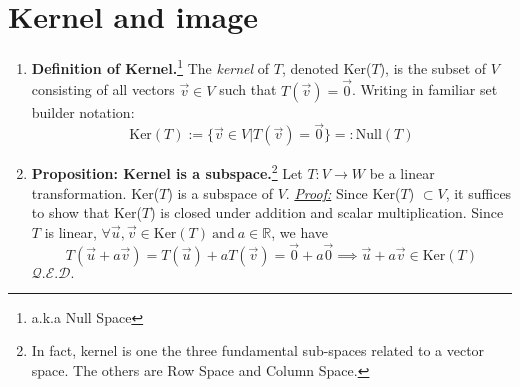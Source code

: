 \documentclass[oneside, 12pt]{book}
\newcommand{\settag}[1]{\renewcommand{\theenumi}{#1}}
\newcommand{\R}{\mathbb{R}}
\newcommand{\qed}{\hfill $\mathcal{Q}.\mathcal{E}.\mathcal{D}.$}
\newcommand{\tbf}[1]{\textbf{#1}}
\newcommand{\tit}[1]{\textit{#1}}
\newcommand{\vv}{\vec{v}}
\newcommand{\vu}{\vec{u}}
\begin{document}
\section{Kernel and image}
    \begin{enumerate}
        \settag{2.3.1}
        \item \tbf{Definition of Kernel.}\footnote{a.k.a Null Space} The \tit{kernel} of $T$, denoted Ker($T$), is the subset of $V$ consisting of all vectors $\vv\in V$ such that $T(\vv) = \vec{0}$. Writing in familiar set builder notation:
        \begin{equation*}
            \text{Ker}(T) := \{\vv \in V | T(\vv) = \vec{0}\} =: \text{Null}(T)
        \end{equation*}
        
        \settag{2.3.2}
        \item \tbf{Proposition: Kernel is a subspace.}\footnote{In fact, kernel is one the three fundamental sub-spaces related to a vector space. The others are Row Space and Column Space.} Let $T: V\xrightarrow{} W$ be a linear transformation. Ker($T$) is a subspace of $V$. \newline
        \tit{\underline{Proof:}} \newline
        Since Ker($T$) $\subset V$, it suffices to show that Ker($T$) is closed under addition and scalar multiplication. Since $T$ is linear, $\forall \vu, \vv \in \text{Ker}(T)~\text{and}~a\in \R$, we have
        \begin{equation*}
            T(\vu + a\vv) = T(\vu) + aT(\vv) = \vec{0} + a\vec{0} \implies \vu + a\vv \in \text{Ker}(T)
        \end{equation*}
        \qed
        
        
        
    \end{enumerate}
    
\end{document}
